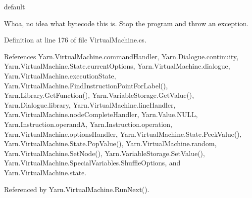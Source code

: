 \begin{DoxyItemize}
\item default

Whoa, no idea what bytecode this is. Stop the program and throw an exception.
\end{DoxyItemize}

Definition at line 176 of file Virtual\-Machine.\-cs.



References Yarn.\-Virtual\-Machine.\-command\-Handler, Yarn.\-Dialogue.\-continuity, Yarn.\-Virtual\-Machine.\-State.\-current\-Options, Yarn.\-Virtual\-Machine.\-dialogue, Yarn.\-Virtual\-Machine.\-execution\-State, Yarn.\-Virtual\-Machine.\-Find\-Instruction\-Point\-For\-Label(), Yarn.\-Library.\-Get\-Function(), Yarn.\-Variable\-Storage.\-Get\-Value(), Yarn.\-Dialogue.\-library, Yarn.\-Virtual\-Machine.\-line\-Handler, Yarn.\-Virtual\-Machine.\-node\-Complete\-Handler, Yarn.\-Value.\-N\-U\-L\-L, Yarn.\-Instruction.\-operand\-A, Yarn.\-Instruction.\-operation, Yarn.\-Virtual\-Machine.\-options\-Handler, Yarn.\-Virtual\-Machine.\-State.\-Peek\-Value(), Yarn.\-Virtual\-Machine.\-State.\-Pop\-Value(), Yarn.\-Virtual\-Machine.\-random, Yarn.\-Virtual\-Machine.\-Set\-Node(), Yarn.\-Variable\-Storage.\-Set\-Value(), Yarn.\-Virtual\-Machine.\-Special\-Variables.\-Shuffle\-Options, and Yarn.\-Virtual\-Machine.\-state.



Referenced by Yarn.\-Virtual\-Machine.\-Run\-Next().


